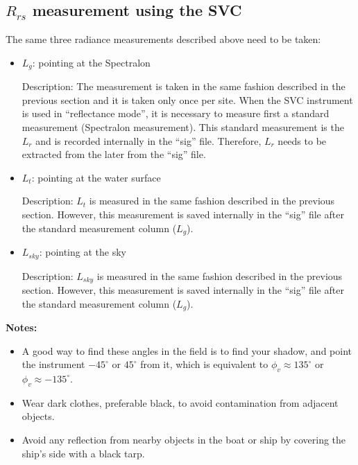 \begin{appendices}
\begin{itemize}[itemsep=2pt,parsep=2pt]
\end{itemize}

\subsection{\texorpdfstring{$R_{rs}$}{Rrs} measurement using the SVC}
The same three radiance measurements described above need to be taken:

\begin{itemize}[itemsep=2pt,parsep=2pt]
	\item $L_g$: pointing at the Spectralon

Description: The measurement is taken in the same fashion described in the previous section and it is taken only once per site. When the SVC instrument is used in ``reflectance mode'', it is necessary to measure first a standard measurement (Spectralon measurement). This standard measurement is the $L_r$ and is recorded internally in the ``sig'' file. Therefore, $L_r$ needs to be extracted from the later from the ``sig'' file. 

	\item $L_t$: pointing at the water surface

Description: $L_t$ is measured in the same fashion described in the previous section. However, this measurement is saved internally in the ``sig'' file after the standard measurement column ($L_g$).

	\item $L_{sky}$: pointing at the sky	

Description: $L_{sky}$ is measured in the same fashion described in the previous section. However, this measurement is saved internally in the ``sig'' file after the standard measurement column ($L_g$).

\end{itemize}
{\bf Notes:}
\begin{itemize}[itemsep=2pt,parsep=2pt]
  \item A good way to find these angles in the field is to find your shadow, and point the instrument $-45^\circ$ or $45^\circ$ from it, which is equivalent to $\phi_v \approx 135^\circ$ or $\phi_v \approx -135^\circ$.

	\item Wear dark clothes, preferable black, to avoid contamination from adjacent objects.

	\item Avoid any reflection from nearby objects in the boat or ship by covering the ship's side with a black tarp. 
\end{itemize}


\end{appendices}
